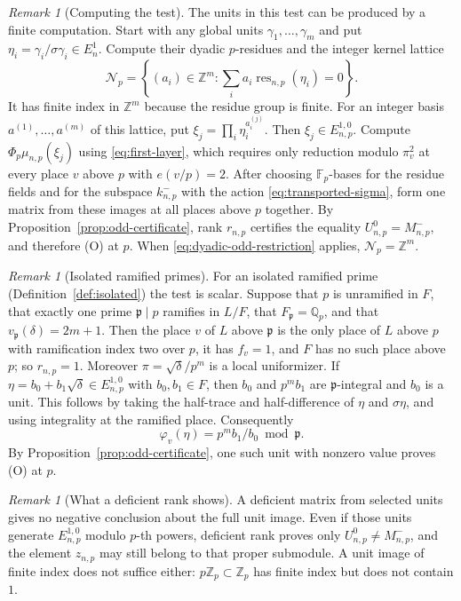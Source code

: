 \documentclass[11pt]{article}
\theoremstyle{plain}
\theoremstyle{definition}
\theoremstyle{remark}
\newtheorem{remark}[theorem]{Remark}
\newcommand{\Z}{\mathbb Z}
\newcommand{\Q}{\mathbb Q}
\newcommand{\F}{\mathbb F}
\begin{document}
\begin{remark}[Computing the test]\label{rem:odd-certificate-computation}
The units in this test can be produced by a finite computation.  Start
with any global units $\gamma_1,\ldots,\gamma_m$ and put
$\eta_i=\gamma_i/\sigma\gamma_i\in E_n^1$.  Compute their dyadic
$p$-residues and the integer kernel lattice
\[
 \mathcal N_p=\left\{(a_i)\in\Z^m:
             \sum_i a_i\operatorname{res}_{n,p}(\eta_i)=0\right\}.
\]
It has finite index in $\Z^m$ because the residue group is finite.  For an
integer basis $a^{(1)},\ldots,a^{(m)}$ of this lattice, put
$\xi_j=\prod_i\eta_i^{a_i^{(j)}}$.  Then $\xi_j\in E_{n,p}^{1,0}$.
Compute $\Phi_p\mu_{n,p}(\xi_j)$ using \eqref{eq:first-layer}, which
requires only reduction modulo $\pi_v^2$ at every place $v$ above $p$
with $e(v/p)=2$.  After choosing $\F_p$-bases for the residue fields and
for the subspace $k_{n,p}^-$ with the action
\eqref{eq:transported-sigma}, form one matrix from these images at all
places above $p$ together.  By Proposition~\ref{prop:odd-certificate}, rank
$r_{n,p}$ certifies the equality $U_{n,p}^0=M_{n,p}^-$, and therefore (O)
at $p$.  When
\eqref{eq:dyadic-odd-restriction} applies, $\mathcal N_p=\Z^m$.
\end{remark}

\begin{remark}[Isolated ramified primes]\label{rem:odd-isolated}
For an isolated ramified prime (Definition~\ref{def:isolated}) the test is
scalar.  Suppose that $p$ is unramified in $F$, that exactly one prime
$\mathfrak p\mid p$ ramifies in $L/F$, that $F_{\mathfrak p}=\Q_p$, and
that $v_{\mathfrak p}(\delta)=2m+1$.  Then the place $v$ of $L$ above
$\mathfrak p$ is the only place of $L$ above $p$ with ramification index
two over $p$, it has $f_v=1$, and $F$ has no such place above $p$; so
$r_{n,p}=1$.  Moreover
$\pi=\sqrt\delta/p^m$ is a local uniformizer.  If
$\eta=b_0+b_1\sqrt\delta\in E_{n,p}^{1,0}$ with $b_0,b_1\in F$, then
$b_0$ and $p^mb_1$ are $\mathfrak p$-integral and $b_0$ is a unit.  This
follows by taking the half-trace and half-difference of $\eta$ and
$\sigma\eta$, and using integrality at the ramified place.  Consequently
\[
  \varphi_v(\eta)=p^mb_1/b_0\bmod\mathfrak p.
\]
By Proposition~\ref{prop:odd-certificate}, one such unit with nonzero
value proves (O) at $p$.
\end{remark}

\begin{remark}[What a deficient rank shows]\label{rem:odd-deficient}
A deficient matrix from selected units gives no negative conclusion about
the full unit image.  Even if those units generate $E_{n,p}^{1,0}$ modulo
$p$-th powers, deficient rank proves only $U_{n,p}^0\ne M_{n,p}^-$, and
the element $z_{n,p}$ may still belong to that proper submodule.  A unit
image of finite index does not suffice either: $p\Z_p\subset\Z_p$ has
finite index but does not contain $1$.
\end{remark}
\end{document}
